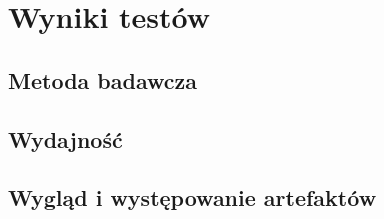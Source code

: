 \chapter{Wyniki testów}
\label{t:wyniki}

	\section{Metoda badawcza}
	\label{t:wyniki:metoda}
	
	\section{Wydajność}
	\label{t:wyniki:wydajnosc}
	
	\section{Wygląd i występowanie artefaktów}
	\label{t:wyniki:artefakty}
	
